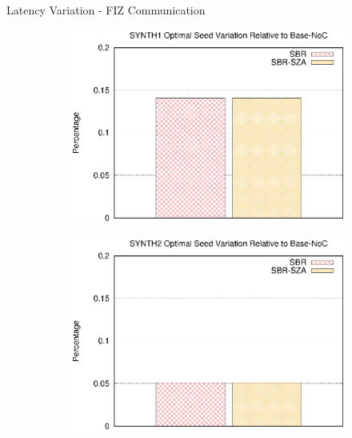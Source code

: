 \begin{frame}{Latency Variation - FIZ Communication}
	\begin{center}
		\begin{figure}
			\begin{subfigure}{0.49\linewidth}
				\includegraphics[width=1.0\linewidth]{charts/synth1/synth1-path-cost-comparison-optimal.eps}
			\end{subfigure}
			\begin{subfigure}{0.49\linewidth}
				\includegraphics[width=1.0\linewidth]{charts/synth2/synth2-path-cost-comparison-optimal.eps}
			\end{subfigure}
		\end{figure}
	\end{center}
\end{frame}